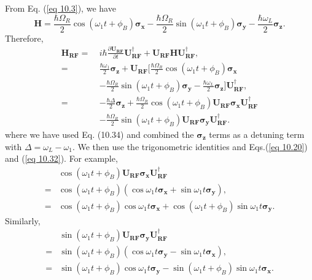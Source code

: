\documentclass{article}
\begin{document}
From Eq. (\ref{eq 10.3}), we have
\begin{equation}\label{eq 10.37}
    \boldsymbol{H}=\frac{\hbar\varOmega_R}{2}\cos(\omega_1t+\phi_B)\boldsymbol{\sigma_x}-\frac{\hbar\varOmega_R}{2}\sin(\omega_1t+\phi_B)\boldsymbol{\sigma_y}
    -\frac{\hbar\omega_L}{2}\boldsymbol{\sigma_z}.\tag{10.37}
\end{equation}
Therefore,
\begin{align*}\label{eq 10.38}
    \boldsymbol{H_{RF}}=\ &i\hbar\frac{\partial \boldsymbol{U_{RF}}}{\partial t}\boldsymbol{U}^\dagger_{\boldsymbol{RF}}+
    \boldsymbol{U_{RF}H}\boldsymbol{U}^\dagger_{\boldsymbol{RF}},\\
    =\ &\frac{\hbar\omega_1}{2}\boldsymbol{\sigma_z}+\boldsymbol{U_{RF}}\bigg[\frac{\hbar\varOmega_R}{2}\cos(\omega_1t+\phi_B)\boldsymbol{\sigma_x}\\
    &-\frac{\hbar\varOmega_R}{2}\sin(\omega_1t+\phi_B)\boldsymbol{\sigma_y}-\frac{\hbar\omega_L}{2}\boldsymbol{\sigma_z}\bigg]\boldsymbol{U}^\dagger_{\boldsymbol{RF}},\\
    =\ &-\frac{\hbar\varDelta}{2}\boldsymbol{\sigma_z}+\frac{\hbar\varOmega_R}{2}\cos(\omega_1t+\phi_B)
    \boldsymbol{U_{RF}\sigma_x}\boldsymbol{U}^\dagger_{\boldsymbol{RF}}\\
    &-\frac{\hbar\varOmega_R}{2}\sin(\omega_1t+\phi_B)\boldsymbol{U_{RF}\sigma_y}\boldsymbol{U}^\dagger_{\boldsymbol{RF}}. \tag{10.38}
\end{align*}
where we have used Eq. (10.34) and combined the $\boldsymbol{\sigma_z}$ terms as a detuning term with
$\varDelta=\omega_L-\omega_1$. We then use the trigonometric identities and Eqs.(\ref{eq 10.20}) and (\ref{eq 10.32}).
For example,
\begin{align*}\label{eq 10.39}
    &\cos(\omega_1t+\phi_B) \boldsymbol{U_{RF}\sigma_x}\boldsymbol{U}^\dagger_{\boldsymbol{RF}}\\
    =&\cos(\omega_1t+\phi_B)(\cos\omega_1t\boldsymbol{\sigma_x}+\sin\omega_1t\boldsymbol{\sigma_y}),\\
    =&\cos(\omega_1t+\phi_B)\cos\omega_1t\boldsymbol{\sigma_x}+
    \cos(\omega_1t+\phi_B)\sin\omega_1t\boldsymbol{\sigma_y}. \tag{10.39}
\end{align*}
Similarly,
\begin{align*}\label{eq 10.40}
    &\sin(\omega_1t+\phi_B) \boldsymbol{U_{RF}\sigma_y}\boldsymbol{U}^\dagger_{\boldsymbol{RF}}\\
    =&\sin(\omega_1t+\phi_B)(\cos\omega_1t\boldsymbol{\sigma_y}-\sin\omega_1t\boldsymbol{\sigma_x}),\\
    =&\sin(\omega_1t+\phi_B)\cos\omega_1t\boldsymbol{\sigma_y}-
    \sin(\omega_1t+\phi_B)\sin\omega_1t\boldsymbol{\sigma_x}. \tag{10.40}
\end{align*}
\end{document}

